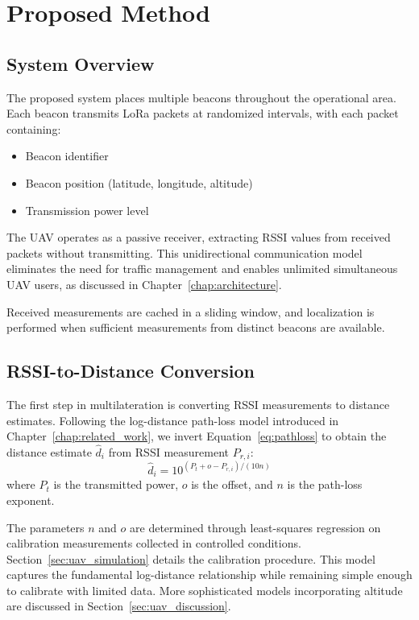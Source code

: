 \documentclass[master,final,11pt]{iscs-thesis}
\begin{document}
\section{Proposed Method}
\label{sec:uav_method}

\subsection{System Overview}

The proposed system places multiple beacons throughout the operational area.
Each beacon transmits LoRa packets at randomized intervals, with each packet containing:
\begin{itemize}
    \item Beacon identifier
    \item Beacon position (latitude, longitude, altitude)
    \item Transmission power level
\end{itemize}

The UAV operates as a passive receiver, extracting RSSI values from received packets without transmitting.
This unidirectional communication model eliminates the need for traffic management and enables unlimited simultaneous UAV users, as discussed in Chapter~\ref{chap:architecture}.

Received measurements are cached in a sliding window, and localization is performed when sufficient measurements from distinct beacons are available.

\subsection{RSSI-to-Distance Conversion}

The first step in multilateration is converting RSSI measurements to distance estimates.
Following the log-distance path-loss model introduced in Chapter~\ref{chap:related_work}, we invert Equation~\ref{eq:pathloss} to obtain the distance estimate $\hat{d}_i$ from RSSI measurement $P_{r,i}$:
\begin{equation}
    \hat{d}_i = 10^{(P_t + o - P_{r,i}) / (10n)}
    \label{eq:rssi_distance_ch4}
\end{equation}
where $P_t$ is the transmitted power, $o$ is the offset, and $n$ is the path-loss exponent.

The parameters $n$ and $o$ are determined through least-squares regression on calibration measurements collected in controlled conditions. Section~\ref{sec:uav_simulation} details the calibration procedure.
This model captures the fundamental log-distance relationship while remaining simple enough to calibrate with limited data.
More sophisticated models incorporating altitude are discussed in Section~\ref{sec:uav_discussion}.
\end{document}
